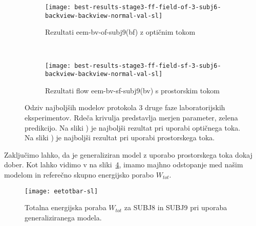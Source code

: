 \begin{figure}[!htbp]
	\centering
	\begin{subfigure}[t]{0.45\columnwidth}
		\texttt{[image: best-results-stage3-ff-field-of-3-subj6-backview-backview-normal-val-sl]}
		\caption{Rezultati eem-bv-of-subj9(bf) z optičnim tokom}
		\label{fig:field-of-3}
	\end{subfigure}
	~
	\begin{subfigure}[t]{0.45\columnwidth}
		\texttt{[image: best-results-stage3-ff-field-sf-3-subj6-backview-backview-normal-val-sl]}
		\caption{Rezultati flow eem-bv-sf-subj9(bv) s prostorskim tokom}
		\label{fig:field-sf-3}
	\end{subfigure}
	\caption[Odziv SUBJ9 modelov protokola 3 2. faze lab. eksperimentov]{Odziv najboljših modelov protokola 3 druge faze laboratorijskih eksperimentov. Rdeča krivulja predstavlja merjen parameter, zelena predikcijo. Na sliki ) je najboljši rezultat pri uporabi optičnega toka. Na sliki ) je najboljši rezultat pri uporabi prostorskega toka.}
	\label{fig:field-3}
\end{figure}


Zaključimo lahko, da je generaliziran model z uporabo prostorskega toka dokaj dober. Kot lahko vidimo v na sliki~\ref{fig:stage2-field3-tot}, imamo majhno odstopanje med našim modelom in referečno skupno energijsko porabo $W_{tot}$.

\begin{comment}
\begin{table}[!htbp]
	\centering
	\begin{tabular}{l S[table-format=3.2, round-mode=places, round-precision=2] S[table-format=3.2, round-mode=places, round-precision=2]}
		\toprule
		& \theadc{$\mathbf{W_{tot}}$ [kcal]} \\
		\cmidrule{2-3}
		\textbf{Model} & \thead{OF} & \thead{SF} \\
		\midrule
		\tdata{stage2-field-3-tot}
		\bottomrule
	\end{tabular}
	\caption[Totalna energijska poraba za protokol 3 2. terenske faze]{Totalna energijska poraba za protokol 3 2. terenske faze.}
	\label{tab:stage2-field-3-tot}
\end{table}
\end{comment}

\begin{figure}[!htbp]
	\centering
	\texttt{[image: eetotbar-sl]}
	\caption{Totalna energijska poraba $W_{tot}$ za SUBJ8 in SUBJ9 pri uporaba generaliziranega modela.}
	\label{fig:stage2-field3-tot}
\end{figure}





